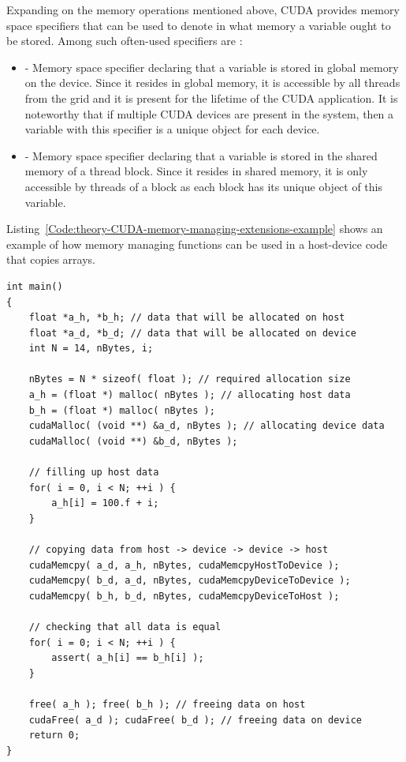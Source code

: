 Expanding on the memory operations mentioned above, CUDA provides memory space specifiers that can be used to denote in what memory a variable ought to be stored. Among such often-used specifiers are \cite{NVIDIAMay2022}:

\begin{itemize}
	\item {} - Memory space specifier declaring that a variable is stored in global memory on the device. Since it resides in global memory, it is accessible by all threads from the grid and it is present for the lifetime of the CUDA application. It is noteworthy that if multiple CUDA devices are present in the system, then a variable with this specifier is a unique object for each device.
	\item {} - Memory space specifier declaring that a variable is stored in the shared memory of a thread block. Since it resides in shared memory, it is only accessible by threads of a block as each block has its unique object of this variable.
\end{itemize}

Listing~\ref{Code:theory-CUDA-memory-managing-extensions-example} shows an example of how memory managing functions can be used in a host-device code that copies arrays.

\begin{lstlisting}[caption= Example of code that utilizes CUDA memory managing extensions of C++. Taken from \emph{Formats for storage of sparse matrices on GPU} \cite{Cejka2020} and Nvidia's \emph{Getting Started with CUDA} presentation \cite{Ruetsch2008}.,label=Code:theory-CUDA-memory-managing-extensions-example]
int main()
{
	float *a_h, *b_h; // data that will be allocated on host
	float *a_d, *b_d; // data that will be allocated on device
	int N = 14, nBytes, i;
	
	nBytes = N * sizeof( float ); // required allocation size
	a_h = (float *) malloc( nBytes ); // allocating host data
	b_h = (float *) malloc( nBytes ); 
	cudaMalloc( (void **) &a_d, nBytes ); // allocating device data
	cudaMalloc( (void **) &b_d, nBytes );
	
	// filling up host data
	for( i = 0, i < N; ++i ) {
		a_h[i] = 100.f + i;
	}

	// copying data from host -> device -> device -> host
	cudaMemcpy( a_d, a_h, nBytes, cudaMemcpyHostToDevice );
	cudaMemcpy( b_d, a_d, nBytes, cudaMemcpyDeviceToDevice );
	cudaMemcpy( b_h, b_d, nBytes, cudaMemcpyDeviceToHost );
	
	// checking that all data is equal
	for( i = 0; i < N; ++i ) {
		assert( a_h[i] == b_h[i] );
	}

	free( a_h ); free( b_h ); // freeing data on host
	cudaFree( a_d ); cudaFree( b_d ); // freeing data on device
	return 0;
}
\end{lstlisting}

